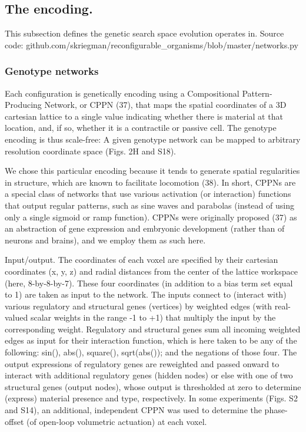 \subsection*{The encoding.}

This subsection defines the genetic search space evolution operates in. Source code: github.com/skriegman/reconfigurable\_organisms/blob/master/networks.py


\subsubsection*{Genotype networks}

Each configuration is genetically encoding using a Compositional Pattern-Producing Network, or CPPN (37), that maps the spatial coordinates of a 3D cartesian lattice to a single value indicating whether there is material at that location, and, if so, whether it is a contractile or passive cell. The genotype encoding is thus scale-free: A given genotype network can be mapped to arbitrary resolution coordinate space (Figs. 2H and S18). 

We chose this particular encoding because it tends to generate spatial regularities in structure, which are known to facilitate locomotion (38). In short, CPPNs are a special class of networks that use various activation (or interaction) functions that output regular patterns, such as sine waves and parabolas (instead of using only a single sigmoid or ramp function). CPPNs were originally proposed (37) as an abstraction of gene expression and embryonic development (rather than of neurons and brains), and we employ them as such here.

Input/output.  The coordinates of each voxel are specified by their cartesian coordinates (x, y, z) and radial distances from the center of the lattice workspace (here, 8-by-8-by-7). These four coordinates (in addition to a bias term set equal to 1) are taken as input to the network. The inputs connect to (interact with) various regulatory and structural genes (vertices) by weighted edges (with real-valued scalar weights in the range -1 to +1) that multiply the input by the corresponding weight. Regulatory and structural genes sum all incoming weighted edges as input for their interaction function, which is here taken to be any of the following: sin(), abs(), square(), sqrt(abs()); and the negations of those four. The output expressions of regulatory genes are reweighted and passed onward to interact with additional regulatory genes (hidden nodes) or else with one of two structural genes (output nodes), whose output is thresholded at zero to determine (express) material presence and type, respectively. In some experiments (Figs. S2 and S14), an additional, independent CPPN was used to determine the phase-offset (of open-loop volumetric actuation) at each voxel.

